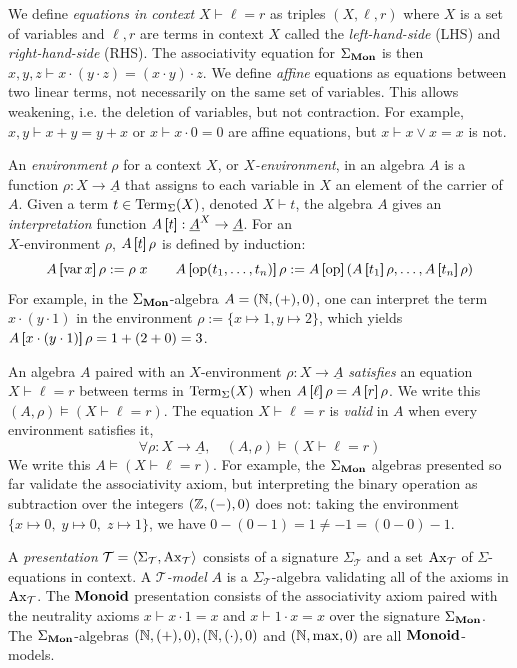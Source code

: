 We define \emph{equations in context} $X \vdash \ell = r$ as triples $(X, \ell, r)$ where $X$ is a set of variables and $\ell,r$ are terms in context $X$ called the \emph{left-hand-side} (LHS) and \emph{right-hand-side} (RHS). The associativity equation for $\Sigma_{\mathbf{Mon}}$ is then $x, y, z \vdash x \cdot (y \cdot z) = (x \cdot y) \cdot z$. We define \emph{affine} equations as equations between two linear terms, not necessarily on the same set of variables. This allows weakening, i.e. the deletion of variables, but not contraction. For example, $x, y \vdash x + y = y + x$ or $x \vdash x \cdot 0 = 0$ are affine equations, but $x \vdash x \vee x = x$ is not.

An \emph{environment} $\rho$ for a context $X$, or \emph{$X$-environment}, in an algebra $A$ is a function $\rho : X \to \underline{A}$ that assigns to each variable in $X$ an element of the carrier of $A$. Given a term $t \in \operatorname{Term}_\Sigma(X)$, denoted $X \vdash t$, the algebra $A$ gives an \emph{interpretation} function $A \left[\!\!\!\:\left[ t \right]\!\!\!\:\right] : \underline{A}^X \to \underline{A}$. For an\\ $X$-environment $\rho$, $A \left[\!\!\!\:\left[ t \right]\!\!\!\:\right] \rho$ is defined by induction:
$$A \brak{\var x} \rho := \rho\; x \qquad A \brak{\op(t_1, \dots, t_n)} \rho := A \brak{\op} (A \brak{t_1} \rho, \dots, A \brak{t_n} \rho)$$
For example, in the $\Sigma_{\mathbf{Mon}}$-algebra $A = (\mathbb N, (+), 0)$, one can interpret the term $x \cdot (y \cdot 1)$ in the environment $\rho := \{x \mapsto 1, y \mapsto 2\}$, which yields $A\left[\!\!\!\:\left[ x \cdot (y \cdot 1) \right]\!\!\!\:\right]\rho = 1 + (2 + 0) = 3$.

An algebra $A$ paired with an $X$-environment $\rho : X \to \underline{A}$ \emph{satisfies} an equation $X \vdash \ell = r$ between terms in $\operatorname{Term}_\Sigma(X)$ when $A \brak{\ell}\rho = A \brak{r}\rho$. We write this $(A, \rho) \models (X \vdash \ell = r)$. The equation $X \vdash \ell = r$ is \emph{valid} in $A$ when every environment satisfies it, $$\forall \rho : X \to \underline{A},\quad (A, \rho) \models (X \vdash \ell = r)$$ We write this $A \models (X \vdash \ell = r)$. For example, the $\Sigma_{\mathbf{Mon}}$ algebras presented so far validate the associativity axiom, but interpreting the binary operation as subtraction over the integers $(\mathbb Z, (-), 0)$ does not: taking the environment $\{x \mapsto 0,\; y \mapsto 0,\; z \mapsto 1\}$, we have $0 - (0 - 1) = 1 \neq -1 = (0 - 0) - 1$.

A \emph{presentation} $\mathcal T = \left\langle \Sigma_\mathcal{T}, \operatorname{Ax}_\mathcal{T} \right\rangle$ consists of a signature $\Sigma_\mathcal{T}$ and a set $\operatorname{Ax}_\mathcal{T}$ of $\Sigma$-equations in context. A \emph{$\mathcal T$-model} $A$ is a $\Sigma_\mathcal{T}$-algebra validating all of the axioms in $\operatorname{Ax}_\mathcal{T}$. The $\mathbf{Monoid}$ presentation consists of the associativity axiom paired with the neutrality axioms $x \vdash x \cdot 1 = x$ and $x \vdash 1 \cdot x = x$ over the signature $\Sigma_{\mathbf{Mon}}$. The $\Sigma_{\mathbf{Mon}}$-algebras $(\mathbb N, (+), 0), (\mathbb N, (\cdot), 0)$ and $(\mathbb N, \max, 0)$ are all $\mathbf{Monoid}$-models.

